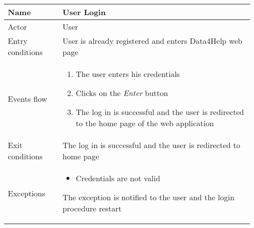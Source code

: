 \FloatBarrier

\begin{table}[h!]
    \begin{tabular}{|l|p{12cm}|}
        \hline
        Name             & User Login \\ \hline
        Actor            & User \\ \hline
        Entry conditions & User is already registered and enters Data4Help web page \\ \hline
        Events flow      & 
        \begin{enumerate}
            \item The user enters his credentials
            \item Clicks on the \textit{Enter} button
            \item The log in is successful and the user is redirected to the home page of the web application
        \end{enumerate} \\ \hline
        Exit conditions  & The log in is successful and the user is redirected to home page \\ \hline
        Exceptions       & 
        \begin{itemize}
            \item Credentials are not valid
        \end{itemize} The exception is notified to the user and the login procedure restart \\ \hline
    \end{tabular}
\end{table}

